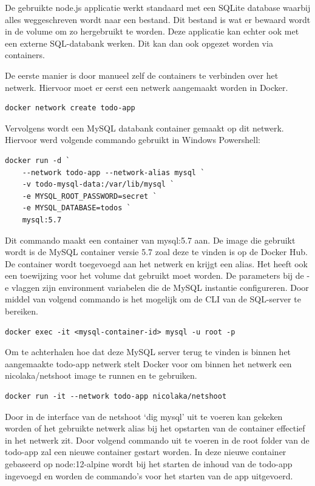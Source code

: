 De gebruikte node.js applicatie werkt standaard met een SQLite database waarbij alles weggeschreven wordt naar een bestand. Dit bestand is wat er bewaard wordt in de volume om zo hergebruikt te worden. Deze applicatie kan echter ook met een externe SQL-databank werken. Dit kan dan ook opgezet worden via containers.

De eerste manier is door manueel zelf de containers te verbinden over het netwerk. Hiervoor moet er eerst een netwerk aangemaakt worden in Docker.
\begin{verbatim}
docker network create todo-app
\end{verbatim}
Vervolgens wordt een MySQL databank container gemaakt op dit netwerk. Hiervoor werd volgende commando gebruikt in Windows Powershell:
\begin{lstlisting}
docker run -d `
    --network todo-app --network-alias mysql `
    -v todo-mysql-data:/var/lib/mysql `
    -e MYSQL_ROOT_PASSWORD=secret `
    -e MYSQL_DATABASE=todos `
    mysql:5.7
\end{lstlisting}
Dit commando maakt een container van mysql:5.7 aan. De image die gebruikt wordt is de MySQL container versie 5.7 zoal deze te vinden is op de Docker Hub. De container wordt toegevoegd aan het netwerk en krijgt een alias. Het heeft ook een toewijzing voor het volume dat gebruikt moet worden. De parameters bij de -e vlaggen zijn environment variabelen die de MySQL instantie configureren. Door middel van volgend commando is het mogelijk om de CLI van de SQL-server te bereiken.

\begin{verbatim}
docker exec -it <mysql-container-id> mysql -u root -p
\end{verbatim}
Om te achterhalen hoe dat deze MySQL server terug te vinden is binnen het aangemaakte todo-app netwerk stelt Docker voor om binnen het netwerk een nicolaka/netshoot image te runnen en te gebruiken.
\begin{verbatim}
docker run -it --network todo-app nicolaka/netshoot
\end{verbatim}
Door in de interface van de netshoot ‘dig mysql' uit te voeren kan gekeken worden of het gebruikte netwerk alias bij het opstarten van de container effectief in het netwerk zit. Door volgend commando uit te voeren in de root folder van de todo-app zal een nieuwe container gestart worden. In deze nieuwe container gebaseerd op node:12-alpine wordt bij het starten de inhoud van de todo-app ingevoegd en worden de commando’s voor het starten van de app uitgevoerd.

